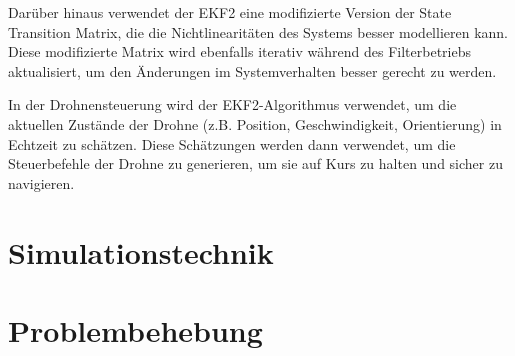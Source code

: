 Darüber hinaus verwendet der EKF2 eine modifizierte Version der State Transition Matrix, die die Nichtlinearitäten des Systems besser modellieren kann. Diese modifizierte Matrix wird ebenfalls iterativ während des Filterbetriebs aktualisiert, um den Änderungen im Systemverhalten besser gerecht zu werden.

In der Drohnensteuerung wird der EKF2-Algorithmus verwendet, um die aktuellen Zustände der Drohne (z.B. Position, Geschwindigkeit, Orientierung) in Echtzeit zu schätzen. Diese Schätzungen werden dann verwendet, um die Steuerbefehle der Drohne zu generieren, um sie auf Kurs zu halten und sicher zu navigieren.

\section{Simulationstechnik} \label{simulationstechnik:section}

\section{Problembehebung} \label{problembehebung:section}
